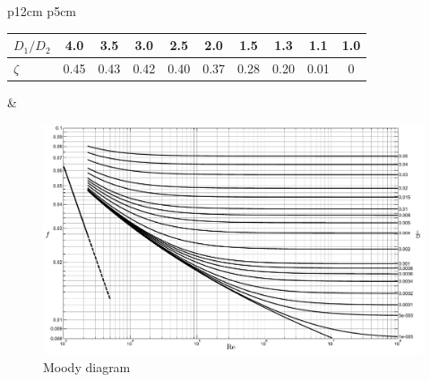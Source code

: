 \begin{tabular}[t]{p{12cm} p{5cm}}
	\begin{tabular}{l c c c c c c c c c}
		$D_1/D_2$ & 4.0 & 3.5 & 3.0 & 2.5 & 2.0 & 1.5 & 1.3 & 1.1 & 1.0   \\ 
		\hline
		$\zeta$    & 0.45    & 0.43    & 0.42      & 0.40    & 0.37     & 0.28 & 0.20 & 0.01 & 0 \\
	\end{tabular}
	&
	\vfill
\end{tabular}

\begin{figure}[ht]
	\caption{Moody diagram}
	\label{fig:Moody diagram}
	\centering
	\includegraphics[width=22cm, angle=270]{fig/stroming_in_leidingen/Moody_diagram.pdf}
\end{figure}